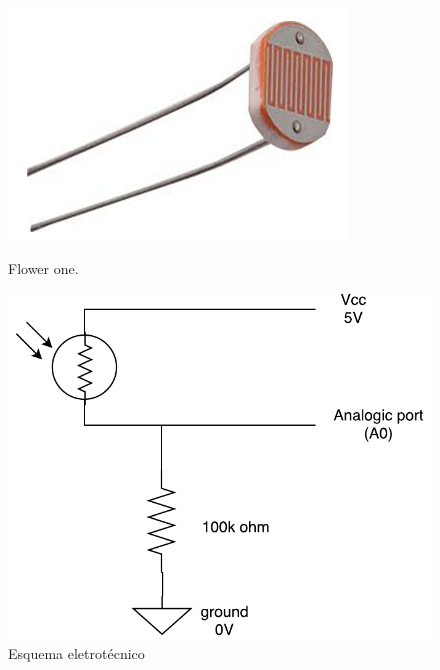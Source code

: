 \begin{figure}[h]
	\centering
	\begin{minipage}[b]{0.4\textwidth}
		\includegraphics[width=\textwidth]{img/hardware/luminosidade.png}
		\caption{Flower one.}
	\end{minipage}
	\hfill
	\begin{minipage}[b]{0.4\textwidth}
		\includegraphics[width=\textwidth]{img/hardware/lumi_esquema.pdf}
		\caption{Esquema eletrotécnico}
	\end{minipage}
\end{figure}











